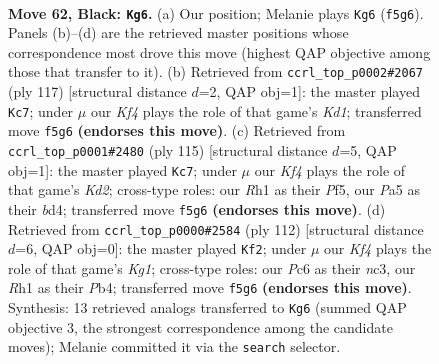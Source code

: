 \documentclass[11pt]{article}
\begin{document}
\clearpage

\begin{figure}[p]\centering
\begin{subfigure}{0.46\textwidth}\centering
\resizebox{\linewidth}{!}{%
\newchessgame
\chessboard[
  setfen={8/8/2pp4/p4k2/8/8/5K2/7r b - - 3 62},
  showmover=false,
  pgfstyle=straightmove, color=movearrow, markmove={f5-g6}
]}
\caption{}
\end{subfigure}\hfill
\begin{subfigure}{0.46\textwidth}\centering
\resizebox{\linewidth}{!}{%
\newchessgame
\chessboard[
  setfen={3k4/6P1/p7/8/2r5/3p1K2/8/8 b - - 0 59},
  showmover=false,
  pgfstyle=straightmove, color=movearrow, markmove={d8-c7}
]}
\caption{}
\end{subfigure}
\\[4pt]
\begin{subfigure}{0.46\textwidth}\centering
\resizebox{\linewidth}{!}{%
\newchessgame
\chessboard[
  setfen={8/3k4/8/1P3p2/p2B4/7K/8/8 b - - 1 58},
  showmover=false,
  pgfstyle=straightmove, color=movearrow, markmove={d7-c7}
]}
\caption{}
\end{subfigure}\hfill
\begin{subfigure}{0.46\textwidth}\centering
\resizebox{\linewidth}{!}{%
\newchessgame
\chessboard[
  setfen={8/8/3k4/5p2/1P6/2n3P1/8/6K1 w - - 6 57},
  showmover=false,
  pgfstyle=straightmove, color=movearrow, markmove={g1-f2}
]}
\caption{}
\end{subfigure}
\caption{\textbf{Move 62, Black: \texttt{Kg6}.} (a) Our position; Melanie plays \texttt{Kg6} (\texttt{f5g6}). Panels (b)--(d) are the retrieved master positions whose correspondence most drove this move (highest QAP objective among those that transfer to it). (b) Retrieved from \texttt{ccrl\_top\_p0002\#2067} (ply 117) [structural distance $d$=2, QAP obj=1]: the master played \texttt{Kc7}; under $\mu$ our \emph{Kf4} plays the role of that game's \emph{Kd1}; transferred move \texttt{f5g6} \textbf{(endorses this move)}. (c) Retrieved from \texttt{ccrl\_top\_p0001\#2480} (ply 115) [structural distance $d$=5, QAP obj=1]: the master played \texttt{Kc7}; under $\mu$ our \emph{Kf4} plays the role of that game's \emph{Kd2}; cross-type roles: our \emph{R}h1 as their \emph{P}f5, our \emph{P}a5 as their \emph{b}d4; transferred move \texttt{f5g6} \textbf{(endorses this move)}. (d) Retrieved from \texttt{ccrl\_top\_p0000\#2584} (ply 112) [structural distance $d$=6, QAP obj=0]: the master played \texttt{Kf2}; under $\mu$ our \emph{Kf4} plays the role of that game's \emph{Kg1}; cross-type roles: our \emph{P}c6 as their \emph{n}c3, our \emph{R}h1 as their \emph{P}b4; transferred move \texttt{f5g6} \textbf{(endorses this move)}. Synthesis: 13 retrieved analogs transferred to \texttt{Kg6} (summed QAP objective 3, the strongest correspondence among the candidate moves); Melanie committed it via the \texttt{search} selector.}
\label{fig:thought-m123}
\end{figure}
\end{document}
